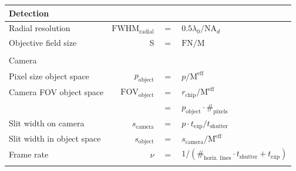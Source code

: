 \documentclass[12pt]{spieman}  %
\begin{document}
\begin{table}[t!]
\begin{tabular}{lrcl}
		\multicolumn{4}{l}{Detection}\\\hline\hline  
		Radial resolution									&$\text{FWHM}_{\text{radial}}$	& $=$					& $0.5 \lambda_0 / \text{NA}_{d}$						\\
		Objective field size							& S															& $=$					& $\text{FN}/{\text{M}}$								\\\\
		\multicolumn{4}{l}{Camera}\\\hline\hline  
		Pixel size object space						& $ p_{\text{object}}$					& $=$					& $p/  \text{M}^{\text{eff}}$							\\
		Camera FOV object space						&$\text{FOV}_{\text{object}}$		& $=$					& $r_{\text{chip}} / \text{M}^{\text{eff}}$				\\
																			&																& $=$					& $p_{\text{object}} \cdot \#_{\text{pixels}}$			\\
		Slit width on camera							& $s_{\text{camera}}$						& $=$					& $ p \cdot t_{\text{exp}} / t_{\text{shutter}} $			\\
		Slit width in object space				& $s_{\text{object}}$						& $=$					& $ s_{\text{camera}}/ \text{M}^{\text{eff}}$			\\
		Frame rate												& $\nu$													& $=$					& $1/(\#_{\text{horiz. lines}} \cdot t_{\text{shutter}} + t_{\text{exp}})$ \\\\

		\end{tabular}
\end{table}

\end{document}
